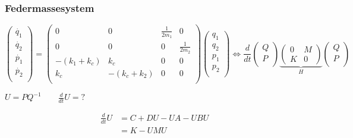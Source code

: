\documentclass[ngerman, aspectratio=169, xcolor={rgb}]{beamer}
\newcommand{\dt}[0]{\frac{d}{dt}}
\begin{document}
\begin{frame}
	\frametitle{Federmassesystem}
	\begin{equation*}
		\begin{pmatrix}
			\dot{q_1} \\
			\dot{q_2} \\
			\dot{p_1} \\
			\dot{p_2} \\
		\end{pmatrix}
		=
		\begin{pmatrix}
			0            & 0            & \frac{1}{2m_1} & 0              \\
			0            & 0            & 0              & \frac{1}{2m_2} \\
			-(k_1 + k_c) & k_c          & 0              & 0              \\
			k_c          & -(k_c + k_2) & 0              & 0              \\
		\end{pmatrix}
		\begin{pmatrix}
			q_1 \\
			q_2 \\
			p_1 \\
			p_2 \\
		\end{pmatrix}
		\Leftrightarrow
		\dt
		\begin{pmatrix}
			Q \\
			P \\
		\end{pmatrix}
		\underbrace{
			\begin{pmatrix}
				0 & M \\
				K & 0
			\end{pmatrix}
		}_{H}
		\begin{pmatrix}
			Q \\
			P \\
		\end{pmatrix}
	\end{equation*}

	\pause

	$U = PQ^{-1} \qquad \dt U = ?$

	\pause

	\begin{align*}
		\dt U & = C  + DU - UA - UBU \\
		      & = K - UMU
	\end{align*}

\end{frame}
\end{document}

